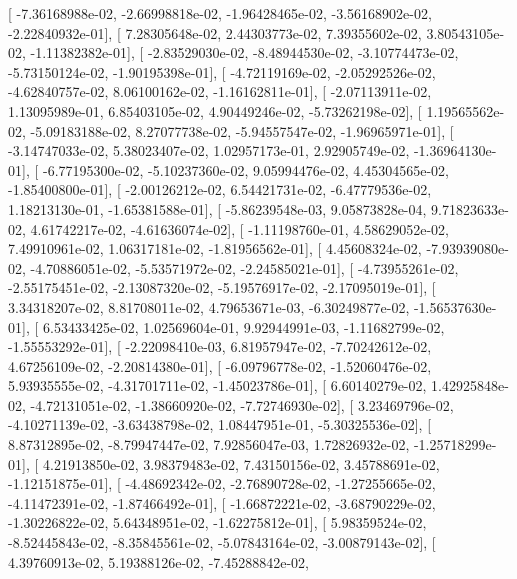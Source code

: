 \documentclass{article}
\begin{document}
       [ -7.36168988e-02,  -2.66998818e-02,  -1.96428465e-02,
         -3.56168902e-02,  -2.22840932e-01],
       [  7.28305648e-02,   2.44303773e-02,   7.39355602e-02,
          3.80543105e-02,  -1.11382382e-01],
       [ -2.83529030e-02,  -8.48944530e-02,  -3.10774473e-02,
         -5.73150124e-02,  -1.90195398e-01],
       [ -4.72119169e-02,  -2.05292526e-02,  -4.62840757e-02,
          8.06100162e-02,  -1.16162811e-01],
       [ -2.07113911e-02,   1.13095989e-01,   6.85403105e-02,
          4.90449246e-02,  -5.73262198e-02],
       [  1.19565562e-02,  -5.09183188e-02,   8.27077738e-02,
         -5.94557547e-02,  -1.96965971e-01],
       [ -3.14747033e-02,   5.38023407e-02,   1.02957173e-01,
          2.92905749e-02,  -1.36964130e-01],
       [ -6.77195300e-02,  -5.10237360e-02,   9.05994476e-02,
          4.45304565e-02,  -1.85400800e-01],
       [ -2.00126212e-02,   6.54421731e-02,  -6.47779536e-02,
          1.18213130e-01,  -1.65381588e-01],
       [ -5.86239548e-03,   9.05873828e-04,   9.71823633e-02,
          4.61742217e-02,  -4.61636074e-02],
       [ -1.11198760e-01,   4.58629052e-02,   7.49910961e-02,
          1.06317181e-02,  -1.81956562e-01],
       [  4.45608324e-02,  -7.93939080e-02,  -4.70886051e-02,
         -5.53571972e-02,  -2.24585021e-01],
       [ -4.73955261e-02,  -2.55175451e-02,  -2.13087320e-02,
         -5.19576917e-02,  -2.17095019e-01],
       [  3.34318207e-02,   8.81708011e-02,   4.79653671e-03,
         -6.30249877e-02,  -1.56537630e-01],
       [  6.53433425e-02,   1.02569604e-01,   9.92944991e-03,
         -1.11682799e-02,  -1.55553292e-01],
       [ -2.22098410e-03,   6.81957947e-02,  -7.70242612e-02,
          4.67256109e-02,  -2.20814380e-01],
       [ -6.09796778e-02,  -1.52060476e-02,   5.93935555e-02,
         -4.31701711e-02,  -1.45023786e-01],
       [  6.60140279e-02,   1.42925848e-02,  -4.72131051e-02,
         -1.38660920e-02,  -7.72746930e-02],
       [  3.23469796e-02,  -4.10271139e-02,  -3.63438798e-02,
          1.08447951e-01,  -5.30325536e-02],
       [  8.87312895e-02,  -8.79947447e-02,   7.92856047e-03,
          1.72826932e-02,  -1.25718299e-01],
       [  4.21913850e-02,   3.98379483e-02,   7.43150156e-02,
          3.45788691e-02,  -1.12151875e-01],
       [ -4.48692342e-02,  -2.76890728e-02,  -1.27255665e-02,
         -4.11472391e-02,  -1.87466492e-01],
       [ -1.66872221e-02,  -3.68790229e-02,  -1.30226822e-02,
          5.64348951e-02,  -1.62275812e-01],
       [  5.98359524e-02,  -8.52445843e-02,  -8.35845561e-02,
         -5.07843164e-02,  -3.00879143e-02],
       [  4.39760913e-02,   5.19388126e-02,  -7.45288842e-02,
\end{document}
